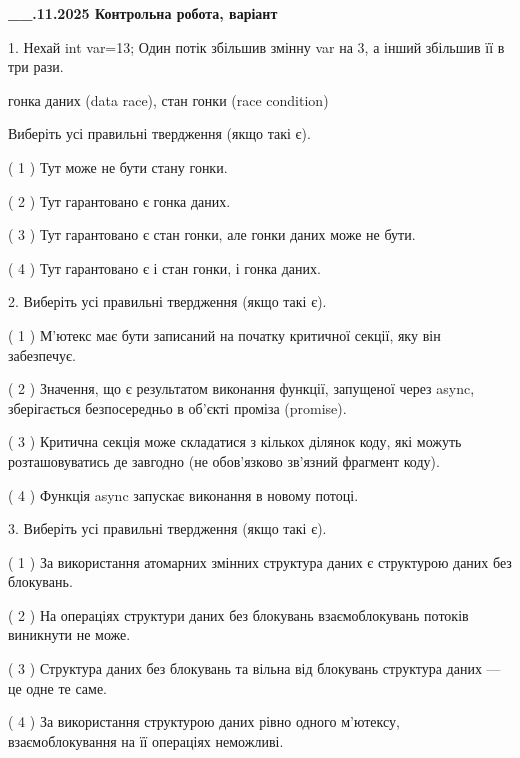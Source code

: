 \documentclass[12pt, ukrainian]{article}
\begin{document}
\newpage
\begin {large}

\textbf{\_\_.11.2025 Контрольна робота, варіант  }\par


{
1. Нехай int var=13; Один потік збільшив змінну var на 3, а інший збільшив її в три рази.

гонка даних (data race), стан гонки (race condition)

Виберіть усі правильні твердження (якщо такі є).\par
\vspace{2mm}
( 1 ) Тут може не бути стану гонки.%

( 2 ) Тут гарантовано є гонка даних.%

( 3 ) Тут гарантовано є стан гонки, але гонки даних може не бути.%

( 4 ) Тут гарантовано є і стан гонки, і гонка даних.%


2. Виберіть усі правильні твердження (якщо такі є).\par
\vspace{2mm}

( 1 ) М’ютекс має бути записаний на початку критичної секції, яку він забезпечує.%

( 2 ) Значення, що є результатом виконання функції, запущеної через async, зберігається безпосередньо в об’єкті проміза (promise).%

( 3 ) Критична секція може складатися з кількох ділянок коду, які можуть розташовуватись де завгодно (не обов’язково зв’язний фрагмент коду).%

( 4 ) Функція async запускає виконання в новому потоці.%


3. Виберіть усі правильні твердження (якщо такі є).\par
\vspace{2mm}

( 1 ) За використання атомарних змінних структура даних є структурою даних без блокувань.%

( 2 ) На операціях структури даних без блокувань взаємоблокувань потоків виникнути не може.%

( 3 ) Структура даних без блокувань та вільна від блокувань структура даних --- це одне те саме.%

( 4 ) За використання структурою даних рівно одного м’ютексу, взаємоблокування на її операціях неможливі.%


}
\end{large}
\end{document}
